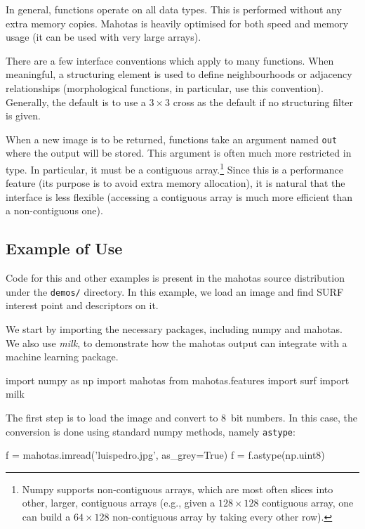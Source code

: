 \documentclass{scrartcl}
\let\code\texttt
\begin{document}
In general, functions operate on all data types. This is performed without any
extra memory copies. Mahotas is heavily optimised for both speed and memory
usage (it can be used with very large arrays).

There are a few interface conventions which apply to many functions. When
meaningful, a structuring element is used to define neighbourhoods or adjacency
relationships (morphological functions, in particular, use this convention).
Generally, the default is to use a $3 \times 3$ cross as the default if no
structuring filter is given.

When a new image is to be returned, functions take an argument named \code{out}
where the output will be stored. This argument is often much more restricted in
type. In particular, it must be a contiguous array.\footnote{Numpy supports
non-contiguous arrays, which are most often slices into other, larger,
contiguous arrays (e.g., given a $128 \times 128$ contiguous array, one can
build a $64 \times 128$ non-contiguous array by taking every other row).} Since
this is a performance feature (its purpose is to avoid extra memory
allocation), it is natural that the interface is less flexible (accessing a
contiguous array is much more efficient than a non-contiguous one).

\subsection{Example of Use}

Code for this and other examples is present in the mahotas source distribution
under the \texttt{demos/} directory. In this example, we load an image and find
SURF interest point and descriptors on it.

We start by importing the necessary packages, including numpy and mahotas. We
also use \textit{milk}, to demonstrate how the mahotas output can integrate
with a machine learning package.

\begin{python}
import numpy as np
import mahotas
from mahotas.features import surf
import milk
\end{python}

The first step is to load the image and convert to 8~bit numbers. In this
case, the conversion is done using standard numpy methods, namely
\code{astype}:

\begin{python}
f = mahotas.imread('luispedro.jpg', as_grey=True)
f = f.astype(np.uint8)
\end{python}
\end{document}
